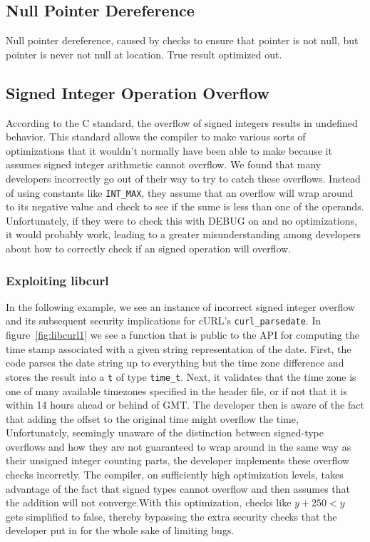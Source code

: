 \documentclass[9pt,twocolumn]{article}
\begin{document}
\subsection{Null Pointer Dereference}
Null pointer dereference, caused by checks to ensure that pointer is not null,
but pointer is never not null at location. True result optimized out.

\subsection{Signed Integer Operation Overflow}
According to the C standard, the overflow of signed integers results in undefined behavior. This standard allows the compiler to make various sorts of optimizations that it wouldn't normally have been able to make because it assumes signed integer arithmetic cannot overflow. We found that many developers incorrectly go out of their way to try to catch these overflows. Instead of using constants like \texttt{INT\_MAX}, they assume that an overflow will wrap around to its negative value and check to see if the sume is less than one of the operands. Unfortunately, if they were to check this with DEBUG on and no optimizations, it would probably work, leading to a greater misunderstanding among developers about how to correctly check if an signed operation will overflow.

\subsubsection{Exploiting libcurl}
In the following example, we see an instance of incorrect signed integer overflow and its subsequent security implications for cURL's \texttt{curl\_parsedate}. In figure~\ref{fig:libcurl1} we see a function that is public to the API for computing the time stamp associated with a given string representation of the date. First, the code parses the date string up to everything but the time zone difference and stores the result into a \texttt{t} of type \texttt{time\_t}. Next, it validates that the time zone is one of many available timezones specified in the header file, or if not that it is within 14 hours ahead or behind of GMT. The developer then is aware of the fact that adding the offset to the original time might overflow the time, Unfortunately, seemingly unaware of the distinction between signed-type overflows and how they are not guaranteed to wrap around in the same way as their unsigned integer counting parts, the developer implements these overflow checks incorretly. The compiler, on sufficiently high optimization levels, takes advantage of the fact that signed types cannot overflow and then assumes that the addition will not converge.With this optimization, checks like $y + 250 < y$ gets simplified to false, thereby bypassing the extra security checks that the developer put in for the whole sake of limiting bugs.
\end{document}

